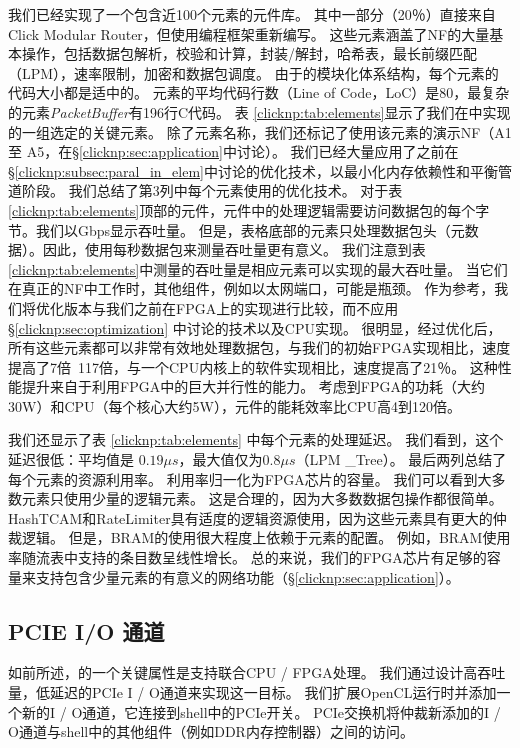 我们已经实现了一个包含近100个元素的\name 元件库。
其中一部分（20％）直接来自Click Modular Router，但使用\name 编程框架重新编写。
这些元素涵盖了NF的大量基本操作，包括数据包解析，校验和计算，封装/解封，哈希表，最长前缀匹配（LPM），速率限制，加密和数据包调度。
由于\name 的模块化体系结构，每个元素的代码大小都是适中的。
元素的平均代码行数（Line of Code，LoC）是80，最复杂的元素\textit {PacketBuffer}有196行C代码。
表 \ref {clicknp:tab:elements}显示了我们在\name 中实现的一组选定的关键元素。
除了元素名称，我们还标记了使用该元素的演示NF（A1 至 A5，在\S \ref {clicknp:sec:application}中讨论）。
我们已经大量应用了之前在\S \ref {clicknp:subsec:paral_in_elem}中讨论的优化技术，以最小化内存依赖性和平衡管道阶段。
我们总结了第3列中每个元素使用的优化技术。
对于表 \ref {clicknp:tab:elements}顶部的元件，元件中的处理逻辑需要访问数据包的每个字节。我们以Gbps显示吞吐量。
但是，表格底部的元素只处理数据包头（元数据）。因此，使用每秒数据包来测量吞吐量更有意义。
我们注意到表 \ref {clicknp:tab:elements}中测量的吞吐量是相应元素可以实现的最大吞吐量。
当它们在真正的NF中工作时，其他组件，例如以太网端口，可能是瓶颈。
作为参考，我们将优化版本与我们之前在FPGA上的实现进行比较，而不应用\S \ref {clicknp:sec:optimization} 中讨论的技术以及CPU实现。
很明显，经过优化后，所有这些元素都可以非常有效地处理数据包，与我们的初始FPGA实现相比，速度提高了7倍~117倍，与一个CPU内核上的软件实现相比，速度提高了21％。
这种性能提升来自于利用FPGA中的巨大并行性的能力。
考虑到FPGA的功耗（大约30W）和CPU（每个核心大约5W），\name 元件的能耗效率比CPU高4到120倍。

我们还显示了表 \ref {clicknp:tab:elements} 中每个元素的处理延迟。
我们看到，这个延迟很低：平均值是 $0.19 \mu s$，最大值仅为$0.8 \mu s$（LPM \_Tree）。
最后两列总结了每个元素的资源利用率。 利用率归一化为FPGA芯片的容量。
我们可以看到大多数元素只使用少量的逻辑元素。
这是合理的，因为大多数数据包操作都很简单。
HashTCAM和RateLimiter具有适度的逻辑资源使用，因为这些元素具有更大的仲裁逻辑。
但是，BRAM的使用很大程度上依赖于元素的配置。 例如，BRAM使用率随流表中支持的条目数呈线性增长。
总的来说，我们的FPGA芯片有足够的容量来支持包含少量元素的有意义的网络功能（\S \ref{clicknp:sec:application}）。



\subsection{PCIE I/O 通道}
\label{clicknp:subsec:pcie}

如前所述，\name 的一个关键属性是支持联合CPU / FPGA处理。
我们通过设计高吞吐量，低延迟的PCIe I / O通道来实现这一目标。
我们扩展OpenCL运行时并添加一个新的I / O通道，它连接到shell中的PCIe开关。
PCIe交换机将仲裁新添加的I / O通道与shell中的其他组件（例如DDR内存控制器）之间的访问。

